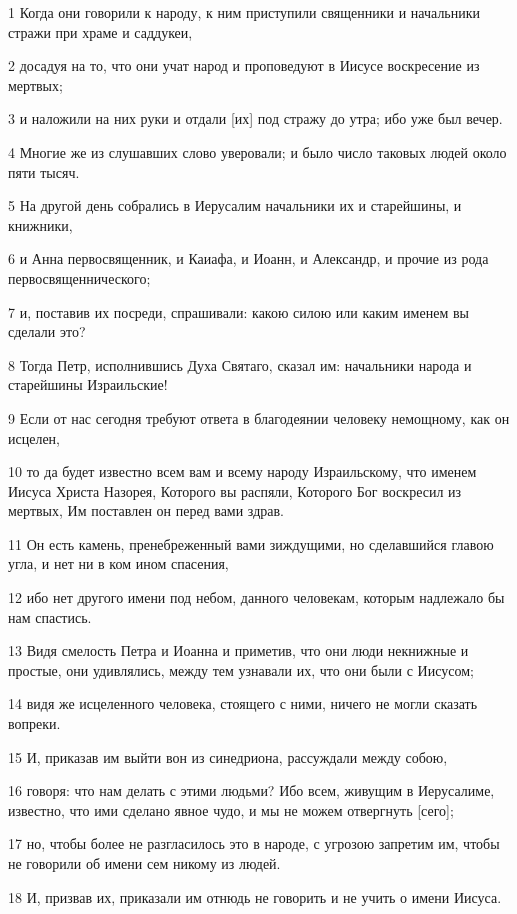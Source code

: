 \par 1 Когда они говорили к народу, к ним приступили священники и начальники стражи при храме и саддукеи,
\par 2 досадуя на то, что они учат народ и проповедуют в Иисусе воскресение из мертвых;
\par 3 и наложили на них руки и отдали [их] под стражу до утра; ибо уже был вечер.
\par 4 Многие же из слушавших слово уверовали; и было число таковых людей около пяти тысяч.
\par 5 На другой день собрались в Иерусалим начальники их и старейшины, и книжники,
\par 6 и Анна первосвященник, и Каиафа, и Иоанн, и Александр, и прочие из рода первосвященнического;
\par 7 и, поставив их посреди, спрашивали: какою силою или каким именем вы сделали это?
\par 8 Тогда Петр, исполнившись Духа Святаго, сказал им: начальники народа и старейшины Израильские!
\par 9 Если от нас сегодня требуют ответа в благодеянии человеку немощному, как он исцелен,
\par 10 то да будет известно всем вам и всему народу Израильскому, что именем Иисуса Христа Назорея, Которого вы распяли, Которого Бог воскресил из мертвых, Им поставлен он перед вами здрав.
\par 11 Он есть камень, пренебреженный вами зиждущими, но сделавшийся главою угла, и нет ни в ком ином спасения,
\par 12 ибо нет другого имени под небом, данного человекам, которым надлежало бы нам спастись.
\par 13 Видя смелость Петра и Иоанна и приметив, что они люди некнижные и простые, они удивлялись, между тем узнавали их, что они были с Иисусом;
\par 14 видя же исцеленного человека, стоящего с ними, ничего не могли сказать вопреки.
\par 15 И, приказав им выйти вон из синедриона, рассуждали между собою,
\par 16 говоря: что нам делать с этими людьми? Ибо всем, живущим в Иерусалиме, известно, что ими сделано явное чудо, и мы не можем отвергнуть [сего];
\par 17 но, чтобы более не разгласилось это в народе, с угрозою запретим им, чтобы не говорили об имени сем никому из людей.
\par 18 И, призвав их, приказали им отнюдь не говорить и не учить о имени Иисуса.
